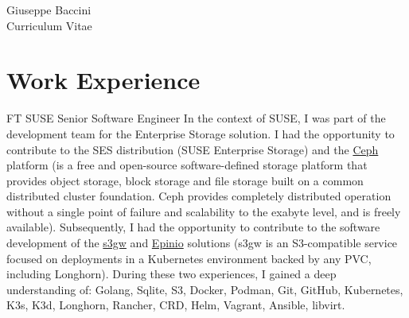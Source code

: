 \documentclass[10pt]{article} %
\begin{document}
\begin{paracol}{2} %


\parbox[top][0.12\textheight][c]{\linewidth}{ %
	\vspace{-0.04\textheight} %
	\centering %
	{\sffamily\Huge Giuseppe Baccini}\\\medskip %
	{\Huge\color{headings}\cvtextfont Curriculum Vitae}
}


\section{Work Experience}





{FT} %
{SUSE} %
{Senior Software Engineer} %
{In the context of SUSE, I was part of the development team for the Enterprise Storage solution.
I had the opportunity to contribute to the SES distribution (SUSE Enterprise Storage) and the
\href{https://ceph.io/en/}{Ceph} platform (is a free and open-source software-defined storage
platform that provides object storage, block storage and file storage built on a common distributed
cluster foundation. Ceph provides completely distributed operation without a single point of failure
and scalability to the exabyte level, and is freely available). Subsequently, I had the opportunity
to contribute to the software development of the \href{https://github.com/aquarist-labs/s3gw}{s3gw}
and \href{https://github.com/epinio/epinio}{Epinio} solutions (s3gw is an S3-compatible service focused
on deployments in a Kubernetes environment backed by any PVC, including Longhorn). During these two
experiences, I gained a deep understanding of: Golang, Sqlite, S3, Docker, Podman,
Git, GitHub, Kubernetes, K3s, K3d, Longhorn, Rancher, CRD, Helm, Vagrant, Ansible, libvirt.} %


\end{paracol}
\end{document}
